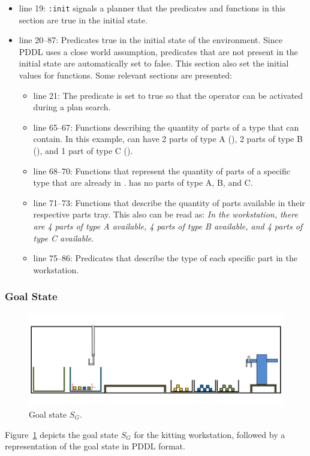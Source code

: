 \begin{itemize}
\item line 19: \texttt{:init} signals a planner that the predicates and functions in this section are true in the initial state.
\item line 20--87: Predicates true in the initial state of the environment. Since PDDL uses a close world assumption, predicates that are not present in the initial state are automatically set to false. This section also set the initial values for functions. Some relevant sections are presented:
\begin{itemize}
\item line 21: The predicate  is set to true so that the operator  can be activated during a plan search.
\item line 65--67: Functions describing the quantity of parts of a type that  can contain. In this example,  can have 2 parts of type A (), 2 parts of type B (), and 1 part of type C ().
\item line 68--70: Functions that represent the quantity of parts of a specific type that are already in .  has no parts of type A, B, and C.
\item line 71--73: Functions that describe the quantity of parts available in their respective parts tray. This also can be read as: \emph{In the workstation, there are 4 parts of type A available, 4 parts of type B available, and 4 parts of type C available}.
\item line 75--86: Predicates that describe the type of each specific part in the workstation.
\end{itemize}
\end{itemize}

\subsubsection{Goal State}
\begin{figure}[h!t!]
\centering
\includegraphics[width=14cm]{Figure/sfinal.jpg}
\caption{Goal state $S_G$.}
\label{fig:sf}
\end{figure}
Figure~\ref{fig:sf} depicts the goal state $S_G$ for the kitting workstation, followed by a representation of the goal state in PDDL format.


